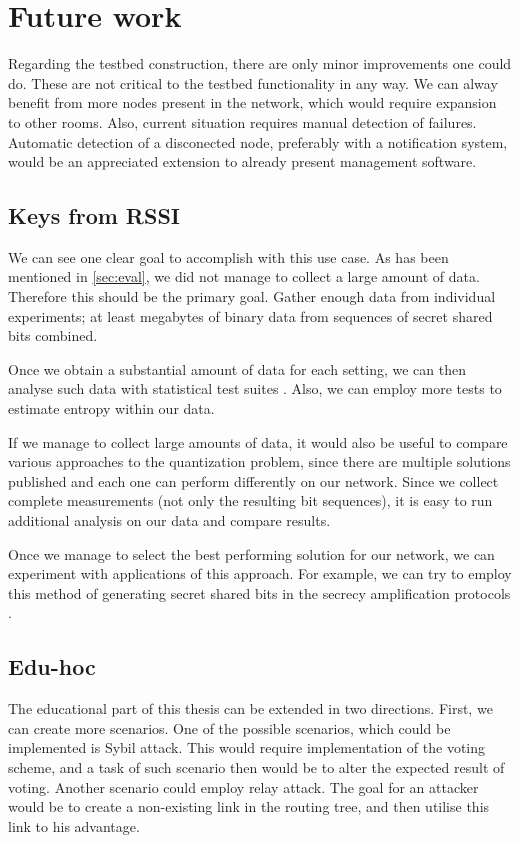 \documentclass[
  print, %
  Table,   %
  nolof,     %
  nolot,     %
           oneside
]{fithesis3}
\begin{document}
\chapter{Future work}\label{ch:future}
Regarding the testbed construction, there are only minor improvements one could do. These are not critical to the testbed functionality in any way. We can alway benefit from more nodes present in the network, which would require expansion to other rooms. Also, current situation requires manual detection of failures. Automatic detection of a disconected node, preferably with a notification system, would be an appreciated extension to already present management software.

  \section{Keys from RSSI}
  We can see one clear goal to accomplish with this use case. As has been mentioned in \ref{sec:eval}, we did not manage to collect a large amount of data. Therefore this should be the primary goal. Gather enough data from individual experiments; at least megabytes of binary data from sequences of secret shared bits combined.

  Once we obtain a substantial amount of data for each setting, we can then analyse such data with statistical test suites \cite{rukhin2001statistical}. Also, we can employ more tests to estimate entropy \cite{barker2012recommendation} within our data.

  If we manage to collect large amounts of data, it would also be useful to compare various approaches to the quantization problem, since there are multiple solutions published \cite{Azimi-Sadjadi2010Fading} \cite{Jana2009Rssi} \cite{azimi2007robust} and each one can perform differently on our network. Since we collect complete measurements (not only the resulting bit sequences), it is easy to run additional analysis on our data and compare results.

  Once we manage to select the best performing solution for our network, we can experiment with applications of this approach. For example, we can try to employ this method of generating secret shared bits in the secrecy amplification protocols \cite{2015-wistp-ostadal}.

  \section{Edu-hoc}
  The educational part of this thesis can be extended in two directions. First, we can create more scenarios. One of the possible scenarios, which could be implemented is Sybil attack. This would require implementation of the voting scheme, and a task of such scenario then would be to alter the expected result of voting. Another scenario could employ relay attack. The goal for an attacker would be to create a non-existing link in the routing tree, and then utilise this link to his advantage.
\end{document}
